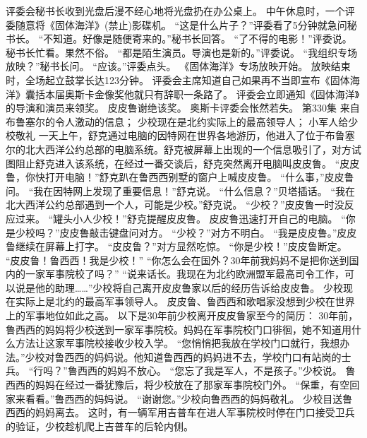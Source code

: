 \documentclass[a4paper,12pt,UTF8,twoside]{ctexbook}
\begin{document}
        评委会秘书长收到光盘后漫不经心地将光盘扔在办公桌上。  
        中午休息时，一个评委随意将《固体海洋》(禁止)影碟机。  
        “这是什么片子？”评委看了5分钟就急问秘书长。  
        “不知道。好像是随便寄来的。”秘书长回答。  
        “了不得的电影！”评委说。  
        秘书长忙看。果然不俗。  
        “都是陌生演员。导演也是新的。”评委说。  
        “我组织专场放映？”秘书长问。  
        “应该。”评委点头。  
        《固体海洋》专场放映开始。  
        放映结束时，全场起立鼓掌长达123分钟。  
        评委会主席知道自己如果再不当即宣布《固体海洋》囊括本届奥斯卡金像奖他就只有辞职一条路了。  
        评委会立即通知《固体海洋》的导演和演员来领奖。  
        皮皮鲁谢绝该奖。  
        奥斯卡评委会怅然若失。          第330集  
        来自布鲁塞尔的令人激动的信息；  
        少校现在是北约实际上的最高领导人；  
        小军人给少校敬礼    
        一天上午，舒克通过电脑的因特网在世界各地游历，他进入了位于布鲁塞尔的北大西洋公约总部的电脑系统。舒克被屏幕上出现的一个信息吸引了，对方试图阻止舒克进入该系统，在经过一番交谈后，舒克突然离开电脑叫皮皮鲁。  
        “皮皮鲁，你快打开电脑！”舒克趴在鲁西西别墅的窗户上喊皮皮鲁。  
        “什么事，”皮皮鲁问。  
        “我在因特网上发现了重要信息！”舒克说。  
        “什么信息？”贝塔插话。  
        “我在北大西洋公约总部遇到一个人，可能是少校。”舒克说。        
        “少校？”皮皮鲁一时没反应过来。  
        “罐头小人少校！”舒克提醒皮皮鲁。  
        皮皮鲁迅速打开自己的电脑。  
        “你是少校吗？”皮皮鲁敲击键盘问对方。  
        “少校？”对方不明白。  
        “我是皮皮鲁。”皮皮鲁继续在屏幕上打字。  
        “皮皮鲁？”对方显然吃惊。  
        “你是少校！”皮皮鲁断定。  
        “皮皮鲁！鲁西西！我是少校！”  
        “你怎么会在国外？30年前我妈妈不是把你送到国内的一家军事院校了吗？”  
        “说来话长。我现在为北约欧洲盟军最高司令工作，可以说是他的助理……”少校将自己离开皮皮鲁家以后的经历告诉给皮皮鲁。  
        少校现在实际上是北约的最高军事领导人。  
        皮皮鲁、鲁西西和歌唱家没想到少校在世界上的军事地位如此之高。  
        以下是30年前少校离开皮皮鲁家至今的简历：  
        30年前，鲁西西的妈妈将少校送到一家军事院校。妈妈在军事院校门口徘徊，她不知道用什么方法让这家军事院校接收少校入学。  
        “您悄悄把我放在学校门口就行，我想办法。”少校对鲁西西的妈妈说。他知道鲁西西的妈妈进不去，学校门口有站岗的士兵。        
        “行吗？”鲁西西的妈妈不放心。  
        “您忘了我是军人，不是孩子。”少校说。  
        鲁西西的妈妈在经过一番犹豫后，将少校放在了那家军事院校门外。  
        “保重，有空回家来看看。”鲁西西的妈妈说。  
        “谢谢您。”少校向鲁西西的妈妈敬礼。  
        少校目送鲁西西的妈妈离去。  
        这时，有一辆军用吉普车在进人军事院校时停在门口接受卫兵的验证，少校趁机爬上吉普车的后轮内侧。  
\end{document}
